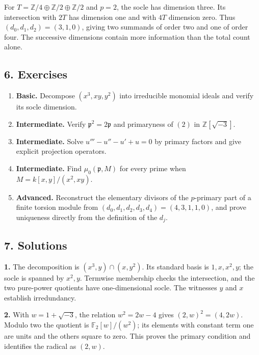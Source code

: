 \documentclass[
]{article}
\providecommand{\tightlist}{%
  \setlength{\itemsep}{0pt}\setlength{\parskip}{0pt}}
\begin{document}
For \(T=\mathbb Z/4\oplus\mathbb Z/2\oplus\mathbb Z/2\) and \(p=2\), the
socle has dimension three. Its intersection with \(2T\) has dimension
one and with \(4T\) dimension zero. Thus \((d_0,d_1,d_2)=(3,1,0)\),
giving two summands of order two and one of order four. The successive
dimensions contain more information than the total count alone.

\subsection{6. Exercises}\label{exercises}

\begin{enumerate}
\def\labelenumi{\arabic{enumi}.}
\tightlist
\item
  \textbf{Basic.} Decompose \((x^3,xy,y^2)\) into irreducible monomial
  ideals and verify its socle dimension.
\item
  \textbf{Intermediate.} Verify \(\mathfrak p^2=2\mathfrak p\) and
  primaryness of \((2)\) in \(\mathbb Z[\sqrt{-3}]\).
\item
  \textbf{Intermediate.} Solve \(u'''-u''-u'+u=0\) by primary factors
  and give explicit projection operators.
\item
  \textbf{Intermediate.} Find \(\mu_0(\mathfrak p,M)\) for every prime
  when \(M=k[x,y]/(x^2,xy)\).
\item
  \textbf{Advanced.} Reconstruct the elementary divisors of the
  \(p\)-primary part of a finite torsion module from
  \((d_0,d_1,d_2,d_3,d_4)=(4,3,1,1,0)\), and prove uniqueness directly
  from the definition of the \(d_j\).
\end{enumerate}

\subsection{7. Solutions}\label{solutions}

\textbf{1.} The decomposition is \((x^3,y)\cap(x,y^2)\). Its standard
basis is \(1,x,x^2,y\); the socle is spanned by \(x^2,y\). Termwise
membership checks the intersection, and the two pure-power quotients
have one-dimensional socle. The witnesses \(y\) and \(x\) establish
irredundancy.

\textbf{2.} With \(w=1+\sqrt{-3}\), the relation \(w^2=2w-4\) gives
\((2,w)^2=(4,2w)\). Modulo two the quotient is \(\mathbb F_2[w]/(w^2)\);
its elements with constant term one are units and the others square to
zero. This proves the primary condition and identifies the radical as
\((2,w)\).
\end{document}
